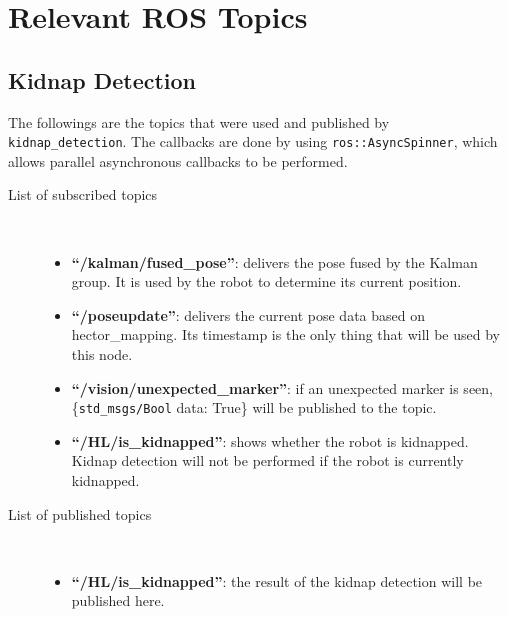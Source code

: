 %




\section{Relevant ROS Topics}\label{section:relevant_ros_topics}

\subsection{Kidnap Detection}
The followings are the topics that were used and published by \texttt{kidnap\_detection}. The callbacks are done by using \texttt{ros::AsyncSpinner}, which allows parallel asynchronous callbacks to be performed.


\begin{description}
\item[List of subscribed topics]\
	\begin{itemize}
	\item  \textbf{``/kalman/fused\_pose''}: delivers the pose fused by the Kalman group. It is used by the robot to determine its current position.
	\item  \textbf{``/poseupdate''}: delivers the current pose data based on hector\_mapping. Its timestamp is the only thing that will be used by this node.
	\item  \textbf{``/vision/unexpected\_marker''}: if an unexpected marker is seen, \{\texttt{std\_msgs/Bool} data: True\} will be published to the topic.
	\item  \textbf{``/HL/is\_kidnapped''}: shows whether the robot is kidnapped. Kidnap detection will not be performed if the robot is currently kidnapped.
	\end{itemize}
\end{description}

\begin{description}
\item[List of published topics]\
	\begin{itemize}
	\item \textbf{``/HL/is\_kidnapped''}: the result of the kidnap detection will be published here.
	\end{itemize}
\end{description}

